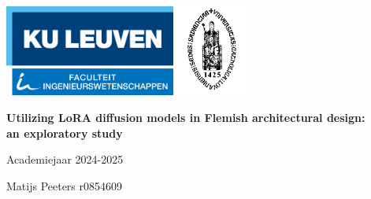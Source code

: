 \thispagestyle{empty}

\includegraphics[height=3cm]{Images/1 Logo FirW CMYK_LOGO.png}
\hspace{6cm}
\includegraphics[height=3cm]{Images/logo_university.png}


\vspace{5cm}
\begin{center}
    \Huge{\rm{ \textbf{Utilizing LoRA diffusion models in Flemish architectural design:\\ an exploratory study}}}\\
    \vspace{0.5cm}
    \Large
\end{center}
\begin{center}
    \Large{Academiejaar 2024-2025}
\end{center}
\vspace{0,5cm}



\vspace{7,5cm}
\begin{flushright}
    \large{Matijs Peeters r0854609}
\end{flushright}